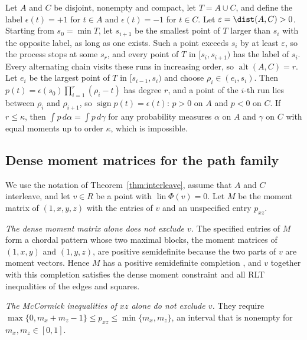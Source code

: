 Let $A$ and $C$ be disjoint, nonempty and compact, let $T=A\cup C$, and define
the label $\epsilon(t)=+1$ for $t\in A$ and $\epsilon(t)=-1$ for $t\in C$. Let
$\varepsilon=\dist(A,C)>0$. Starting from $s_0=\min T$, let $s_{i+1}$ be the
smallest point of $T$ larger than $s_i$ with the opposite label, as long as
one exists. Such a point exceeds $s_i$ by at least $\varepsilon$, so the
process stops at some $s_r$, and every point of $T$ in $[s_i,s_{i+1})$ has the
label of $s_i$. Every alternating chain visits these runs in increasing
order, so $\operatorname{alt}(A,C)=r$. Let $e_i$ be the largest point of $T$
in $[s_{i-1},s_i)$ and choose $\rho_i\in(e_i,s_i)$. Then
$p(t)=\epsilon(s_0)\prod_{i=1}^r(\rho_i-t)$ has degree $r$, and a point of the
$i$-th run lies between $\rho_i$ and $\rho_{i+1}$, so $\operatorname{sign}p(t)=\epsilon(t)$:
$p>0$ on $A$ and $p<0$ on $C$. If $r\le\kappa$, then $\int p\,d\alpha=\int p\,d\gamma$
for any probability measures $\alpha$ on $A$ and $\gamma$ on $C$ with equal
moments up to order $\kappa$, which is impossible.

\subsection{Dense moment matrices for the path family}\label{app:sdp}

We use the notation of Theorem~\ref{thm:interleave}, assume that $A$ and $C$
interleave, and let $v\in R$ be a point with $\operatorname{lin}\Phi(v)=0$. Let
$M$ be the moment matrix of $(1,x,y,z)$ with the entries of $v$ and an
unspecified entry $p_{xz}$.

\emph{The dense moment matrix alone does not exclude $v$.} The specified
entries of $M$ form a chordal pattern whose two maximal blocks, the moment
matrices of $(1,x,y)$ and $(1,y,z)$, are positive semidefinite because the two
parts of $v$ are moment vectors. Hence $M$ has a positive semidefinite
completion \citep{GroneEtAl1984}, and $v$ together with this completion
satisfies the dense moment constraint and all RLT inequalities of the edges
and squares.

\emph{The McCormick inequalities of $xz$ alone do not exclude $v$.} They
require $\max\{0,m_x+m_z-1\}\le p_{xz}\le\min\{m_x,m_z\}$, an interval that is
nonempty for $m_x,m_z\in[0,1]$.

